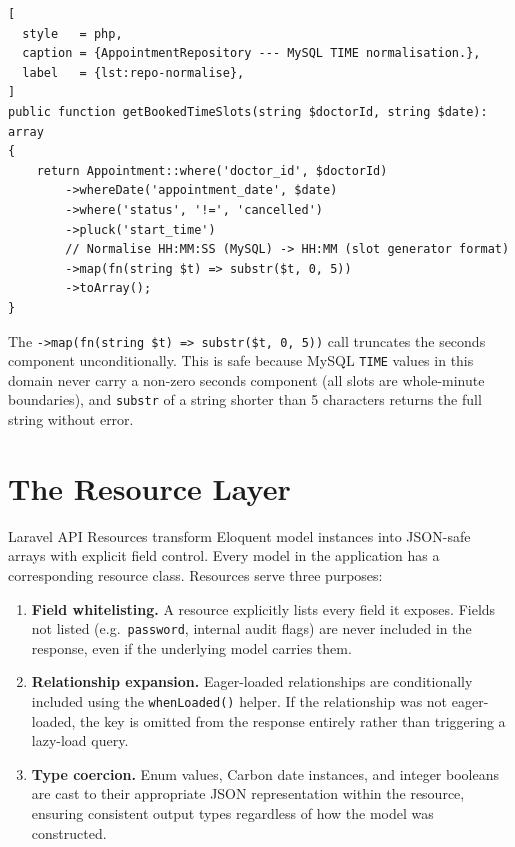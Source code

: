 \begin{lstlisting}[
  style   = php,
  caption = {AppointmentRepository --- MySQL TIME normalisation.},
  label   = {lst:repo-normalise},
]
public function getBookedTimeSlots(string $doctorId, string $date): array
{
    return Appointment::where('doctor_id', $doctorId)
        ->whereDate('appointment_date', $date)
        ->where('status', '!=', 'cancelled')
        ->pluck('start_time')
        // Normalise HH:MM:SS (MySQL) -> HH:MM (slot generator format)
        ->map(fn(string $t) => substr($t, 0, 5))
        ->toArray();
}
\end{lstlisting}

The \texttt{->map(fn(string \$t) => substr(\$t, 0, 5))} call truncates
the seconds component unconditionally. This is safe because MySQL
\texttt{TIME} values in this domain never carry a non-zero seconds
component (all slots are whole-minute boundaries), and \texttt{substr}
of a string shorter than 5 characters returns the full string without
error.

\section{The Resource Layer}
\label{sec:resource-layer}

Laravel API Resources transform Eloquent model instances into JSON-safe
arrays with explicit field control. Every model in the application has a
corresponding resource class. Resources serve three purposes:

\begin{enumerate}
  \item \textbf{Field whitelisting.} A resource explicitly lists every
    field it exposes. Fields not listed (e.g.\ \texttt{password},
    internal audit flags) are never included in the response, even if
    the underlying model carries them.
  \item \textbf{Relationship expansion.} Eager-loaded relationships are
    conditionally included using the \texttt{whenLoaded()} helper. If the
    relationship was not eager-loaded, the key is omitted from the
    response entirely rather than triggering a lazy-load query.
  \item \textbf{Type coercion.} Enum values, Carbon date instances, and
    integer booleans are cast to their appropriate JSON representation
    within the resource, ensuring consistent output types regardless of
    how the model was constructed.
\end{enumerate}

